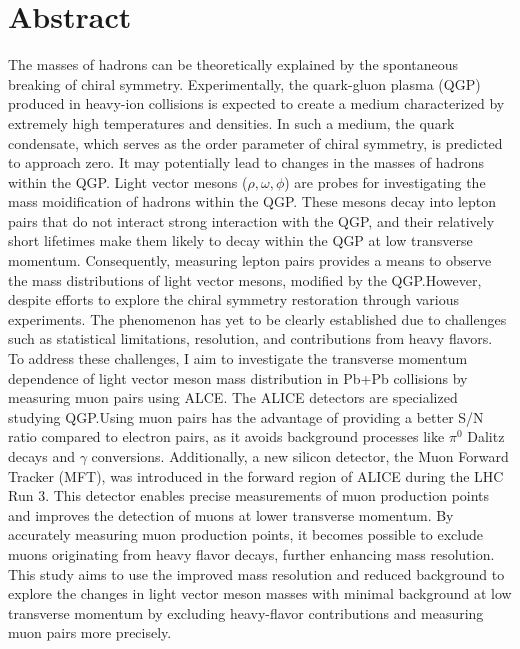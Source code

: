\section*{Abstract}
The masses of hadrons can be theoretically explained by the spontaneous breaking of chiral symmetry. Experimentally, the quark-gluon plasma (QGP) produced in heavy-ion collisions is expected to create a medium characterized by extremely high temperatures and densities. In such a medium, the quark condensate, which serves as the order parameter of chiral symmetry, is predicted to approach zero. It may potentially lead to changes in the masses of hadrons within the QGP. Light vector mesons ($\rho, \omega, \phi$) are  probes for investigating the mass moidification of hadrons within the QGP. These mesons decay into lepton pairs that do not interact strong interaction with the QGP, and their relatively short lifetimes make them likely to decay within the QGP at low transverse momentum. Consequently, measuring lepton pairs provides a means to observe the mass distributions of light vector mesons, modified by the QGP.However, despite efforts to explore the chiral symmetry restoration through various experiments. The phenomenon has yet to be clearly established due to challenges such as statistical limitations, resolution, and contributions from heavy flavors. To address these challenges, I aim to investigate the transverse momentum dependence of light vector meson mass distribution in Pb+Pb collisions by measuring muon pairs using ALCE. The ALICE detectors are specialized studying QGP.Using muon pairs has the advantage of providing a better S/N ratio compared to electron pairs, as it avoids background processes like $\pi^0$ Dalitz decays and $\gamma$ conversions. Additionally, a new silicon detector, the Muon Forward Tracker (MFT), was introduced in the forward region of ALICE during the LHC Run 3. This detector enables precise measurements of muon production points and improves the detection of muons at lower transverse momentum. By accurately measuring muon production points, it becomes possible to exclude muons originating from heavy flavor decays, further enhancing mass resolution. This study aims to use the improved mass resolution and reduced background to explore the changes in light vector meson masses with minimal background at low transverse momentum by excluding heavy-flavor contributions and measuring muon pairs more precisely.

